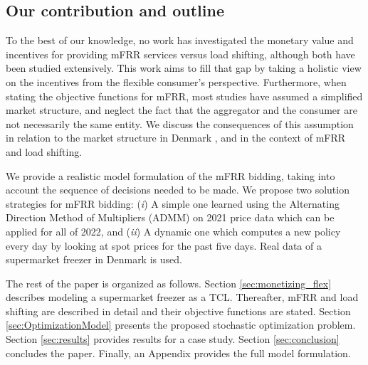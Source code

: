\vspace{-1mm}
\subsection{Our contribution and outline}
%
To the best of our knowledge, no work has investigated the monetary value and incentives for providing mFRR services versus load shifting, although both have been studied extensively. This work aims to fill that gap by taking a holistic view on the incentives from the flexible consumer's perspective. Furthermore, when stating the objective functions for mFRR, most studies have assumed a simplified market structure, and neglect the fact that the aggregator and the consumer are not necessarily the same entity. We discuss the consequences of this assumption in relation to the market structure in Denmark \cite{gade2022ecosystem}, and in the context of mFRR and load shifting.

We provide a realistic model formulation of the mFRR bidding, taking into account the sequence of decisions needed to be made. We propose two solution strategies for mFRR bidding: (\textit{i}) A simple one learned using the Alternating Direction Method of Multipliers (ADMM) on 2021 price data which can be applied for all of 2022, and (\textit{ii}) A dynamic one which computes a new policy every day by looking at spot prices for the past five days. Real data of a supermarket freezer  in Denmark is used.


The rest of the paper is organized as follows. Section \ref{sec:monetizing_flex} describes modeling a supermarket freezer as a TCL. Thereafter, mFRR and load shifting are described in detail and their objective functions are stated. Section \ref{sec:OptimizationModel} presents the proposed stochastic optimization problem. 
Section \ref{sec:results} provides  results for a case study. Section \ref{sec:conclusion} concludes the paper. Finally, an Appendix provides the full model formulation. 
